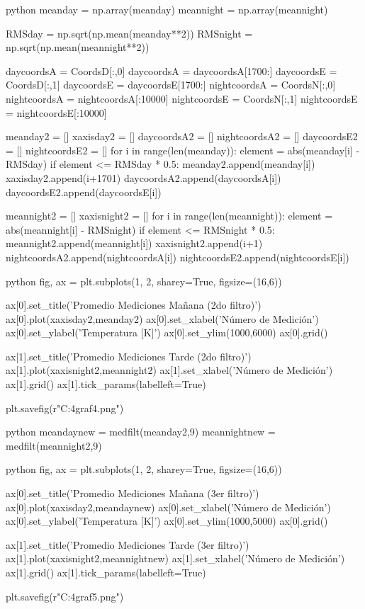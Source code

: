 \begin{sourcecode}[\label{codigo-python}]{python}
meanday = np.array(meanday)
meannight = np.array(meannight)

RMSday = np.sqrt(np.mean(meanday**2))
RMSnight = np.sqrt(np.mean(meannight**2))

daycoordsA = CoordsD[:,0]
daycoordsA = daycoordsA[1700:]
daycoordsE = CoordsD[:,1]
daycoordsE = daycoordsE[1700:]
nightcoordsA = CoordsN[:,0]
nightcoordsA = nightcoordsA[:10000]
nightcoordsE = CoordsN[:,1]
nightcoordsE = nightcoordsE[:10000]


meanday2 = []
xaxisday2 = []
daycoordsA2 = []
nightcoordsA2 = []
daycoordsE2 = []
nightcoordsE2 = []
for i in range(len(meanday)):
    element = abs(meanday[i] - RMSday)
    if element <= RMSday * 0.5:
        meanday2.append(meanday[i])
        xaxisday2.append(i+1701)
        daycoordsA2.append(daycoordsA[i])
        daycoordsE2.append(daycoordsE[i])
                
meannight2 = []
xaxisnight2 = []
for i in range(len(meannight)):
    element = abs(meannight[i] - RMSnight)
    if element <= RMSnight * 0.5:
        meannight2.append(meannight[i])
        xaxisnight2.append(i+1)    
        nightcoordsA2.append(nightcoordsA[i])
        nightcoordsE2.append(nightcoordsE[i])
\end{sourcecode}

\begin{sourcecode}[\label{codigo-python}]{python}
fig, ax = plt.subplots(1, 2, sharey=True, figsize=(16,6))

ax[0].set_title('Promedio Mediciones Mañana (2do filtro)')
ax[0].plot(xaxisday2,meanday2)
ax[0].set_xlabel('Número de Medición')
ax[0].set_ylabel('Temperatura [K]')
ax[0].set_ylim(1000,6000)
ax[0].grid()

ax[1].set_title('Promedio Mediciones Tarde (2do filtro)')
ax[1].plot(xaxisnight2,meannight2)
ax[1].set_xlabel('Número de Medición')
ax[1].grid()
ax[1].tick_params(labelleft=True)

plt.savefig(r"C:\Users\Usuario\Downloads\inf4graf4.png")
\end{sourcecode}

\begin{sourcecode}[\label{codigo-python}]{python}
meandaynew = medfilt(meanday2,9)
meannightnew = medfilt(meannight2,9)
\end{sourcecode}

\begin{sourcecode}[\label{codigo-python}]{python}
fig, ax = plt.subplots(1, 2, sharey=True, figsize=(16,6))

ax[0].set_title('Promedio Mediciones Mañana (3er filtro)')
ax[0].plot(xaxisday2,meandaynew)
ax[0].set_xlabel('Número de Medición')
ax[0].set_ylabel('Temperatura [K]')
ax[0].set_ylim(1000,5000)
ax[0].grid()

ax[1].set_title('Promedio Mediciones Tarde (3er filtro)')
ax[1].plot(xaxisnight2,meannightnew)
ax[1].set_xlabel('Número de Medición')
ax[1].grid()
ax[1].tick_params(labelleft=True)

plt.savefig(r"C:\Users\Usuario\Downloads\inf4graf5.png")
\end{sourcecode}

